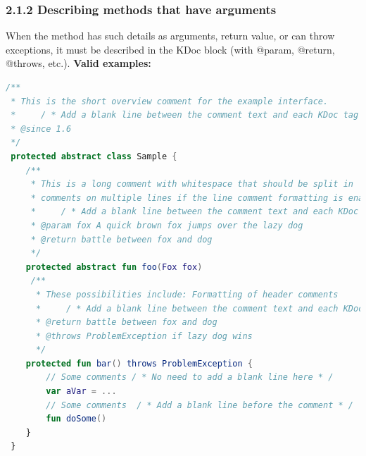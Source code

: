 \subsubsection*{\textbf{2.1.2 Describing methods that have arguments}}
\leavevmode\newline
\label{sec:2.1.2}
When the method has such details as arguments, return value, or can throw exceptions, it must be described in the KDoc block (with @param, @return, @throws, etc.).
\textbf{Valid examples:}
\begin{lstlisting}[language=Kotlin]
/** 
 * This is the short overview comment for the example interface.
 *     / * Add a blank line between the comment text and each KDoc tag underneath * /
 * @since 1.6
 */
 protected abstract class Sample {
    /**
     * This is a long comment with whitespace that should be split in 
     * comments on multiple lines if the line comment formatting is enabled.
     *     / * Add a blank line between the comment text and each KDoc tag underneath * /
     * @param fox A quick brown fox jumps over the lazy dog
     * @return battle between fox and dog 
     */
    protected abstract fun foo(Fox fox)
     /**
      * These possibilities include: Formatting of header comments
      *     / * Add a blank line between the comment text and each KDoc tag underneath * /
      * @return battle between fox and dog
      * @throws ProblemException if lazy dog wins
      */
    protected fun bar() throws ProblemException {
        // Some comments / * No need to add a blank line here * /   
        var aVar = ...
        // Some comments  / * Add a blank line before the comment * /   
        fun doSome()
    }
 }
\end{lstlisting}
